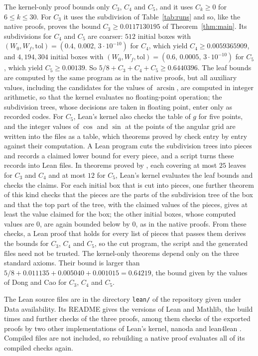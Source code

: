 \documentclass[11pt]{amsart}
\theoremstyle{definition}
\theoremstyle{remark}
\numberwithin{equation}{section}
\newcommand{\lean}[1]{\texttt{\detokenize{#1}}}
\newcommand{\CThree}{0.0117130195}
\newcommand{\LeanKbound}{0.6440396}%
\newcommand{\LeanKCFour}{0.0059365909}%
\newcommand{\LeanKCFive}{0.00139}%
\begin{document}
The kernel-only proof bounds only $C_3$, $C_4$ and $C_5$, and it uses $C_k\ge0$ for $6\le k\le30$. For $C_3$ it uses the subdivision of Table~\ref{tab:runs} and so, like the native proofs, proves the bound $C_3\ge\CThree$ of Theorem~\ref{thm:main}. Its subdivisions for $C_4$ and $C_5$ are coarser: $512$ initial boxes with $(W_0,W_f,\mathrm{tol})=(0.4,\,0.002,\,3\cdot10^{-10})$ for $C_4$, which yield $C_4\ge\LeanKCFour$, and $4{,}194{,}304$ initial boxes with $(W_0,W_f,\mathrm{tol})=(0.6,\,0.0005,\,3\cdot10^{-10})$ for $C_5$, which yield $C_5\ge\LeanKCFive$. So $5/8+C_3+C_4+C_5\ge\LeanKbound$. The leaf bounds are computed by the same program as in the native proofs, but all auxiliary values, including the candidates for the values of $\arcsin$, are computed in integer arithmetic, so that the kernel evaluates no floating-point operation; the subdivision trees, whose decisions are taken in floating point, enter only as recorded codes. For $C_5$, Lean's kernel also checks the table of $g$ for five points, and the integer values of $\cos$ and $\sin$ at the points of the angular grid are written into the files as a table, which theorems proved by \lean{decide +kernel} check entry by entry against their computation. A Lean program cuts the subdivision trees into pieces and records a claimed lower bound for every piece, and a script turns these records into Lean files. In theorems proved by \lean{decide +kernel}, each covering at most $25$ leaves for $C_3$ and $C_4$ and at most $12$ for $C_5$, Lean's kernel evaluates the leaf bounds and checks the claims. For each initial box that is cut into pieces, one further theorem of this kind checks that the pieces are the parts of the subdivision tree of the box and that the top part of the tree, with the claimed values of the pieces, gives at least the value claimed for the box; the other initial boxes, whose computed values are $0$, are again bounded below by $0$, as in the native proofs. From these checks, a Lean proof that holds for every list of pieces that passes them derives the bounds for $C_3$, $C_4$ and $C_5$, so the cut program, the script and the generated files need not be trusted. The kernel-only theorems depend only on the three standard axioms. Their bound is larger than $5/8+0.011135+0.005040+0.001015=0.64219$, the bound given by the values of Dong and Cao for $C_3$, $C_4$ and $C_5$.


The Lean source files are in the directory \texttt{lean/} of the repository given under Data availability. Its README gives the versions of Lean and Mathlib, the build times and further checks of the three proofs, among them checks of the exported proofs by two other implementations of Lean's kernel, nanoda \cite{nanoda} and lean4lean \cite{Car24}. Compiled files are not included, so rebuilding a native proof evaluates all of its compiled checks again.
\end{document}
